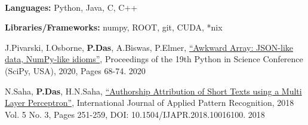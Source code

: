 \documentclass[10pt, letterpaper]{fulldeps}
\begin{document}
%
%
\vspace{-5pt}
\\
\vspace{-20pt}

%
%
\vspace{-5pt}
\textbf{Languages:} Python, Java, C, C++

\textbf{Libraries/Frameworks:} numpy, ROOT, git, CUDA, *nix
\vspace{-6pt}

%
%
\small{\begin{tightitemize}
    \item J.Pivarski, I.Osborne, {\textbf{P.Das}}, A.Biswas, P.Elmer, {\href{http://conference.scipy.org/proceedings/scipy2020/jim_pivarski.html}{``Awkward Array: JSON-like data, NumPy-like idioms''}}, Proceedings of the 19th Python in Science Conference (SciPy, USA), 2020, Pages 68-74. \hfill{2020}
    \item N.Saha, {\textbf{P.Das}}, H.N.Saha, {\href{https://www.inderscienceonline.com/doi/abs/10.1504/IJAPR.2018.094819}{``Authorship Attribution of Short Texts using a Multi Layer Perceptron''}}, International Journal of Applied Pattern Recognition, 2018 Vol. 5 No. 3, Pages 251-259, DOI: 10.1504/IJAPR.2018.10016100. \hfill{2018}
\end{tightitemize}}
\end{document}
